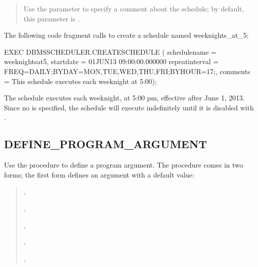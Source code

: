\documentclass[letterpaper,10pt,english,openany,oneside]{sphinxmanual}
\begin{document}
\begin{quote}

Use the  parameter to specify a comment about the
schedule; by default, this parameter is .
\end{quote}


The following code fragment calls  to create a schedule
named weeknights\_at\_5:

%
\begin{sphinxVerbatim}[commandchars=\\\{\}]
EXEC
  DBMS\PYGZus{}SCHEDULER.CREATE\PYGZus{}SCHEDULE (
    schedule\PYGZus{}name    =\PYGZgt{} \PYGZsq{}weeknights\PYGZus{}at\PYGZus{}5\PYGZsq{},
    start\PYGZus{}date       =\PYGZgt{} \PYGZsq{}01\PYGZhy{}JUN\PYGZhy{}13 09:00:00.000000\PYGZsq{}
    repeat\PYGZus{}interval  =\PYGZgt{} \PYGZsq{}FREQ=DAILY;BYDAY=MON,TUE,WED,THU,FRI;BYHOUR=17;\PYGZsq{},
    comments         =\PYGZgt{} \PYGZsq{}This schedule executes each weeknight at 5:00\PYGZsq{});
\end{sphinxVerbatim}

The schedule executes each weeknight, at 5:00 pm, effective after June
1, 2013. Since no  is specified, the schedule will execute
indefinitely until it is disabled with .

\newpage


\subsection{DEFINE\_PROGRAM\_ARGUMENT}
\label{\detokenize{define_program_argument::doc}}\label{\detokenize{define_program_argument:define-program-argument}}
Use the  procedure to define a program
argument. The  procedure comes in two forms;
the first form defines an argument with a default value:
\begin{quote}

\begin{DUlineblock}{0em}
\item[] 
\item[] ,
\item[] ,
\item[] ,
\item[] ,
\item[] ,
\item[] 
\end{DUlineblock}
\end{quote}
\end{document}
